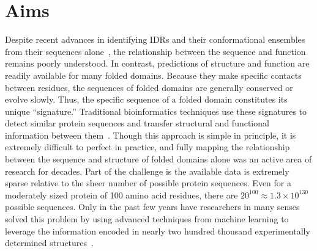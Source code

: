 \section{Aims}
Despite recent advances in identifying IDRs and their conformational ensembles from their sequences alone~\cite{Mao2010, vanderLee2014, Das2015, Necci2021}, the relationship between the sequence and function remains poorly understood. In contrast, predictions of structure and function are readily available for many folded domains. Because they make specific contacts between residues, the sequences of folded domains are generally conserved or evolve slowly. Thus, the specific sequence of a folded domain constitutes its unique ``signature.'' Traditional bioinformatics techniques use these signatures to detect similar protein sequences and transfer structural and functional information between them~\cite{Camacho2009, Eddy2009, Mistry2020}. Though this approach is simple in principle, it is extremely difficult to perfect in practice, and fully mapping the relationship between the sequence and structure of folded domains alone was an active area of research for decades. Part of the challenge is the available data is extremely sparse relative to the sheer number of possible protein sequences. Even for a moderately sized protein of 100 amino acid residues, there are $20^{100} \approx 1.3 \times 10^{130}$ possible sequences. Only in the past few years have researchers in many senses solved this problem by using advanced techniques from machine learning to leverage the information encoded in nearly two hundred thousand experimentally determined structures~\cite{Jumper2021}.

